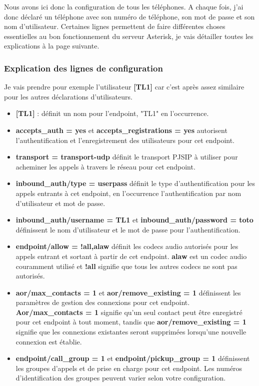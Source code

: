 \documentclass[12pt, a4paper]{article}
\begin{document}
	Nous avons ici donc la configuration de tous les téléphones. A chaque fois, j'ai
	donc déclaré un téléphone avec son numéro de téléphone, son mot de passe et son
	nom d'utilisateur. Certaines lignes permettent de faire différentes choses
	essentielles au bon fonctionnement du serveur Asterisk, je vais détailler 
	toutes les explications à la page suivante. 

	\subsubsection*{Explication des lignes de configuration}
	Je vais prendre pour exemple l'utilisateur \textbf{[TL1]} car c'est après
	assez similaire pour les autres déclarations d'utilisateurs. 

	\begin{itemize}
		\item \textbf{[TL1]} : définit un nom pour l'endpoint, "TL1" en l'occurrence.\\
		\item \textbf{accepts\_auth = yes} et \textbf{accepts\_registrations = yes} autorisent l'authentification et l'enregistrement des utilisateurs pour cet endpoint.\\
		\item \textbf{transport = transport-udp} définit le transport PJSIP à utiliser pour acheminer les appels à travers le réseau pour cet endpoint.\\
		\item \textbf{inbound\_auth/type = userpass} définit le type d'authentification pour les appels entrants à cet endpoint, en l'occurrence l'authentification par nom d'utilisateur et mot de passe.\\
		\item \textbf{inbound\_auth/username = TL1} et \textbf{inbound\_auth/password = toto} définissent le nom d'utilisateur et le mot de passe pour l'authentification.\\
		\item \textbf{endpoint/allow = !all,alaw} définit les codecs audio autorisés pour les appels entrant et sortant à partir de cet endpoint. \textbf{alaw} est un codec audio couramment utilisé et \textbf{!all} signifie que tous les autres codecs ne sont pas autorisés.\\
		\item \textbf{aor/max\_contacts = 1} et \textbf{aor/remove\_existing = 1} définissent les paramètres de gestion des connexions pour cet endpoint. \textbf{Aor/max\_contacts = 1} signifie qu'un seul contact peut être enregistré pour cet endpoint à tout moment, tandis que \textbf{aor/remove\_existing = 1} signifie que les connexions existantes seront supprimées lorsqu'une nouvelle connexion est établie.\\
		\item \textbf{endpoint/call\_group = 1} et \textbf{endpoint/pickup\_group = 1} définissent les groupes d'appels et de prise en charge pour cet endpoint. Les numéros d'identification des groupes peuvent varier selon votre configuration.\\
	\end{itemize}
\end{document}
